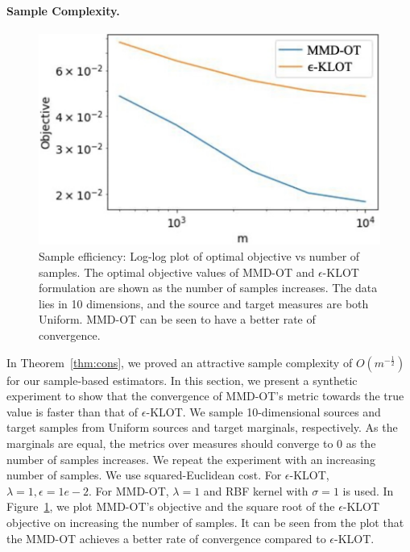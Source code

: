 \paragraph{Sample Complexity.}
\begin{figure}[t]
    \centering
    \includegraphics[scale=0.5]{chapter-1/images/sc.pdf}
    \caption{Sample efficiency: Log-log plot of optimal objective vs number of samples. The optimal objective values of MMD-OT and $\epsilon$-KLOT formulation are shown as the number of samples increases. The data lies in 10 dimensions, and the source and target measures are both Uniform. MMD-OT can be seen to have a better rate of convergence.}
    \label{samp-supp}
\end{figure}
In Theorem~\ref{thm:cons}, we proved an attractive sample complexity of $O\left(m^{-\frac{1}{2}}\right)$ for our sample-based estimators. In this section, we present a synthetic experiment to show that the convergence of MMD-OT's metric towards the true value is faster than that of $\epsilon$-KLOT. We sample 10-dimensional sources and target samples from Uniform sources and target marginals, respectively. As the marginals are equal, the metrics over measures should converge to 0 as the number of samples increases. We repeat the experiment with an increasing number of samples. 
We use squared-Euclidean cost. For $\epsilon$-KLOT, $\lambda=1, \epsilon=1e-2$. For MMD-OT, $\lambda=1$ and RBF kernel with $\sigma=1$ is used. In Figure~\ref{samp-supp}, we plot MMD-OT's objective and the square root of the $\epsilon$-KLOT objective on increasing the number of samples. It can be seen from the plot that the MMD-OT achieves a better rate of convergence compared to $\epsilon$-KLOT.
